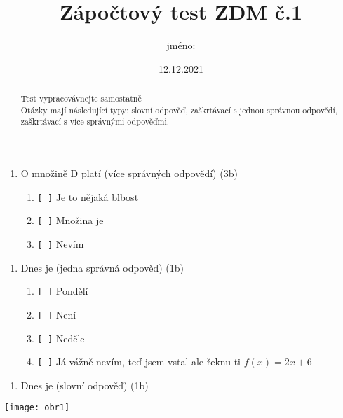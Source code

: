\documentclass[a4paper]{article}
\title{Zápočtový test ZDM č.1}
\author{jméno: \texttt{\detokenize{______________}}}
\date{12.12.2021}
\begin{document}
\maketitle

\renewcommand{\abstractname}{Pokyny k vypracování}
\begin{abstract}
\noindent Test vypracovávnejte samostatně\\
Otázky mají následující typy: slovní odpověď, zaškrtávací s jednou správnou odpovědí, zaškrtávací s více správnými odpověďmi.\\
\end{abstract}

\begin{enumerate}
  \item O množině D platí (více správných odpovědí) \hfill (3b)\\
    \begin{enumerate}
      \item \texttt{[ ]} Je to nějaká blbost\\
      \item \texttt{[ ]} Množina je\\
      \item \texttt{[ ]} Nevím\\
    \end{enumerate}
\end{enumerate}


\begin{enumerate}
  \item Dnes je (jedna správná odpověď) \hfill (1b)\\
    \begin{enumerate}
      \item \texttt{[ ]} Pondělí\\
      \item \texttt{[ ]} Není\\
      \item \texttt{[ ]} Neděle\\
      \item \texttt{[ ]} Já vážně nevím, teď jsem vstal ale řeknu ti $f(x)=2x+6$\\
    \end{enumerate}
\end{enumerate}

\begin{enumerate}
  \item Dnes je (slovní odpověď) \hfill (1b)\\


  
\end{enumerate}

\texttt{[image: obr1]}
\end{document}
